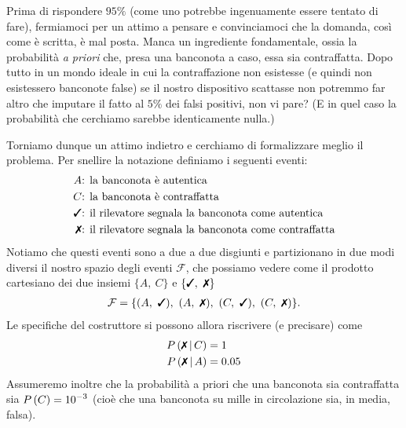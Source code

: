 Prima di rispondere $95\%$ (come uno potrebbe ingenuamente essere tentato di
fare), fermiamoci per un attimo a pensare e convinciamoci che la domanda,
così come è scritta, è mal posta. Manca un ingrediente fondamentale,
ossia la probabilità \emph{a priori} che, presa una banconota a caso, essa
sia contraffatta. Dopo tutto in un mondo ideale in cui la contraffazione non
esistesse (e quindi non esistessero banconote false) se il nostro dispositivo
scattasse non potremmo far altro che imputare il fatto al $5\%$ dei falsi
positivi, non vi pare? (E in quel caso la probabilità che cerchiamo sarebbe
identicamente nulla.)

Torniamo dunque un attimo indietro e cerchiamo di formalizzare meglio il
problema. Per snellire la notazione definiamo i seguenti eventi:
\begin{align*}
A & {\text{: la banconota è autentica}}\\
C & {\text{: la banconota è contraffatta}}\\
\cmark & {\text{: il rilevatore segnala la banconota come autentica}}\\
\xmark & {\text{: il rilevatore segnala la banconota come contraffatta}}
\end{align*}
Notiamo che questi eventi sono a due a due disgiunti e partizionano in due modi
diversi il nostro spazio degli eventi $\mathcal{F}$, che possiamo vedere come il
prodotto cartesiano dei due insiemi $\{A,~C\}$ e
$\{\cmark,~\xmark\}$
\begin{align*}
  \mathcal{F} = \{(A,~\cmark),~(A,~\xmark),~(C,~\cmark),~(C,~\xmark)\}.
\end{align*}
Le specifiche del costruttore si possono allora riscrivere (e precisare) come
\begin{align*}
  \prob{\xmark \cond C} &= 1\\
  \prob{\xmark \cond A} &= 0.05
\end{align*}
Assumeremo inoltre che la probabilità a priori che una banconota sia
contraffatta sia $\displaystyle P\left(C\right) = 10^{-3}$ (cioè che una banconota su mille
in circolazione sia, in media, falsa).

